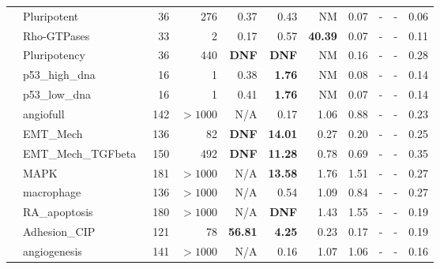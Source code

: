 \documentclass[preprint,12pt]{elsarticle}
\newcounter{rownumber}
\newcommand\rownb{\stepcounter{rownumber}\arabic{rownumber}}
\begin{document}
\begin{table}[!htb]
{\begin{tabular}{rlrrrrrrrrr}
    \rownb & Pluripotent~\cite{DesignPrinciplesGeneNetworks} & 36 & 276 & 0.37 & 0.43 & NM & 0.07 & - & - & 0.06 \\
    \rownb & Rho-GTPases~\cite{DesignPrinciplesGeneNetworks} & 33 & 2 & 0.17 & 0.57 & \textbf{40.39} & 0.07 & - & - & 0.11 \\
    \rownb & Pluripotency~\cite{YachieKinoshita2018} & 36 & 440 & \textbf{DNF} & \textbf{DNF} & NM & 0.16 & - & - & 0.28 \\
    \rownb & p53\_high\_dna~\cite{DesignPrinciplesGeneNetworks} & 16 & 1 & 0.38 & \textbf{1.76} & NM & 0.08 & - & - & 0.14 \\
    \rownb & p53\_low\_dna~\cite{DesignPrinciplesGeneNetworks} & 16 & 1 & 0.41 & \textbf{1.76} & NM & 0.07 & - & - & 0.14 \\
    
    \midrule %
    \rownb & angiofull~\cite{Weinstein2017} & 142 & $>1000$ & N/A & 0.17 & 1.06 & 0.88 & - & - & 0.23 \\
    \rownb & EMT\_Mech~\cite{Sullivan2022} & 136 & 82 & \textbf{DNF} & \textbf{14.01} & 0.27 & 0.20 & - & - & 0.25 \\
    \rownb & EMT\_Mech\_TGFbeta~\cite{Sullivan2022} & 150 & 492 & \textbf{DNF} & \textbf{11.28} & 0.78 & 0.69 & - & - & 0.35 \\
    \rownb & MAPK~\cite{aghamiri2020automated} & 181 & $>1000$ & N/A & \textbf{13.58} & 1.76 & 1.51 & - & - & 0.27 \\
    \rownb & macrophage~\cite{DesignPrinciplesGeneNetworks} & 136 & $>1000$ & N/A & 0.54 & 1.09 & 0.84 & - & - & 0.27 \\
    \rownb & RA\_apoptosis~\cite{aghamiri2020automated} & 180 & $>1000$ & N/A & \textbf{DNF} & 1.43 & 1.55 & - & - & 0.19 \\
    \rownb & Adhesion\_CIP~\cite{guberman2020boolean} & 121 & 78 & \textbf{56.81} & \textbf{4.25} & 0.23 & 0.17 & - & - & 0.19 \\
    \rownb & angiogenesis~\cite{DesignPrinciplesGeneNetworks} & 141 & $>1000$ & N/A & 0.16 & 1.07 & 1.06 & - & - & 0.16 \\
    

\end{tabular}}
\end{table}
\end{document}
